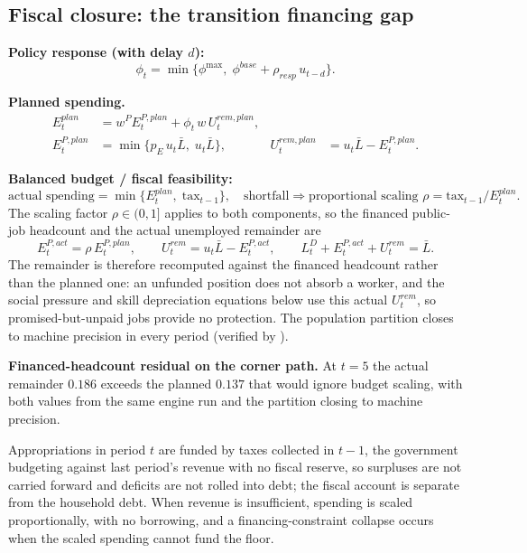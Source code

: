 \documentclass[review,12pt]{elsarticle}
\theoremstyle{plain}
\theoremstyle{definition}
\theoremstyle{remark}
\newcommand{\barL}{\bar{L}}
\begin{document}
\subsection{Fiscal closure: the transition financing gap}
\textbf{Policy response (with delay $d$):}
\begin{equation}
\phi_t=\min\{\phi^{\max},\;\phi^{base}+\rho_{resp}\,u_{t-d}\}.
\end{equation}

\textbf{Planned spending.}
\begin{equation}
\begin{aligned}
E_t^{plan}&=w^P E_t^{P,plan}+\phi_t\,w\,U_t^{rem,plan},\\
E_t^{P,plan}&=\min\{p_E\,u_t\barL,\;u_t\barL\},&
U_t^{rem,plan}&=u_t\barL-E_t^{P,plan}.
\end{aligned}
\end{equation}

\textbf{Balanced budget / fiscal feasibility:}
\begin{equation}
\text{actual spending}=\min\{E_t^{plan},\;\text{tax}_{t-1}\},\quad
\text{shortfall}\Rightarrow \text{proportional scaling }\rho=\text{tax}_{t-1}/E_t^{plan}.
\end{equation}
The scaling factor $\rho\in(0,1]$ applies to both components, so the financed public-job headcount and the actual unemployed remainder are
\begin{equation}
E_t^{P,act}=\rho\,E_t^{P,plan},\qquad
U_t^{rem}=u_t\barL-E_t^{P,act},\qquad
L_t^D+E_t^{P,act}+U_t^{rem}=\barL.
\end{equation}
The remainder is therefore recomputed against the financed headcount rather than the planned one: an unfunded position does not absorb a worker, and the social pressure and skill depreciation equations below use this actual $U_t^{rem}$, so promised-but-unpaid jobs provide no protection. The population partition closes to machine precision in every period (verified by ).

\smallskip\noindent\textbf{Financed-headcount residual on the corner path.} At $t=5$ the actual remainder $0.186$ exceeds the planned $0.137$ that would ignore budget scaling, with both values from the same engine run and the partition closing to machine precision.

Appropriations in period $t$ are funded by taxes collected in $t-1$, the government budgeting against last period's revenue with no fiscal reserve, so surpluses are not carried forward and deficits are not rolled into debt; the fiscal account is separate from the household debt. When revenue is insufficient, spending is scaled proportionally, with no borrowing, and a financing-constraint collapse occurs when the scaled spending cannot fund the floor.
\end{document}
